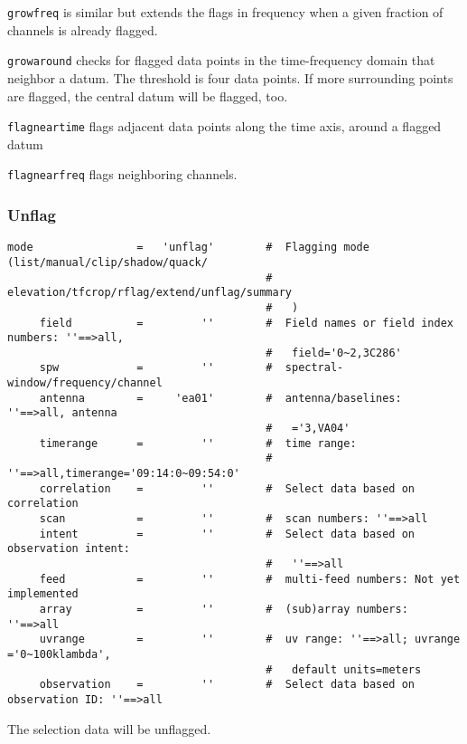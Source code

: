 {\tt growfreq} is similar but extends the flags in frequency when a given
fraction of channels is already flagged.

{\tt growaround} checks for flagged data points in the time-frequency
domain that neighbor a datum. The threshold is four data points. If
more surrounding points are flagged, the central datum will be
flagged, too.

{\tt flagneartime} flags adjacent data points along the time axis, around a flagged datum

{\tt  flagnearfreq} flags neighboring channels. 


\subsubsection{Unflag}
\label{section:edit.tflagdata.mode.unflag}
\small
\begin{verbatim}
mode                =   'unflag'        #  Flagging mode (list/manual/clip/shadow/quack/
                                        #   elevation/tfcrop/rflag/extend/unflag/summary
                                        #   )
     field          =         ''        #  Field names or field index numbers: ''==>all,
                                        #   field='0~2,3C286'
     spw            =         ''        #  spectral-window/frequency/channel
     antenna        =     'ea01'        #  antenna/baselines: ''==>all, antenna
                                        #   ='3,VA04'
     timerange      =         ''        #  time range:
                                        #   ''==>all,timerange='09:14:0~09:54:0'
     correlation    =         ''        #  Select data based on correlation
     scan           =         ''        #  scan numbers: ''==>all
     intent         =         ''        #  Select data based on observation intent:
                                        #   ''==>all
     feed           =         ''        #  multi-feed numbers: Not yet implemented
     array          =         ''        #  (sub)array numbers: ''==>all
     uvrange        =         ''        #  uv range: ''==>all; uvrange ='0~100klambda',
                                        #   default units=meters
     observation    =         ''        #  Select data based on observation ID: ''==>all
\end{verbatim}
\normalsize

The selection data will be unflagged. 


